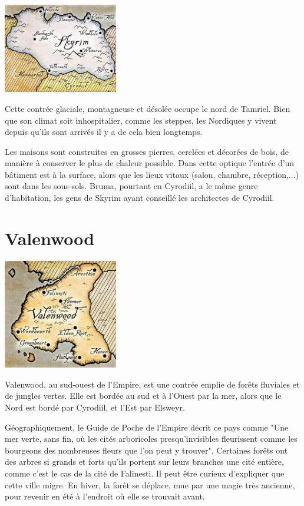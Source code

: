 \begin{center}
\includegraphics[width=5cm]{images/map_skyrim.jpg}
\end{center}

Cette contrée glaciale, montagneuse et désolée occupe le nord de Tamriel. Bien que son climat soit inhospitalier, comme les steppes, les Nordiques y vivent depuis qu'ils sont arrivés il y a de cela bien longtemps.

Les maisons sont construites en grosses pierres, cerclées et décorées de bois, de manière à conserver le plus de chaleur possible. Dans cette optique l'entrée d'un bâtiment est à la surface, alors que les lieux vitaux (salon, chambre, réception,...) sont dans les sous-sols. Bruma, pourtant en Cyrodiil, a le même genre d'habitation, les gens de Skyrim ayant conseillé les architectes de Cyrodiil.

\section{Valenwood}

\begin{center}
\includegraphics[width=5cm]{images/map_valenwood.jpg}
\end{center}

Valenwood, au sud-ouest de l'Empire, est une contrée emplie de forêts fluviales et de jungles vertes. Elle est bordée au sud et à l'Ouest par la mer, alors que le Nord est bordé par Cyrodiil, et l'Est par Elsweyr. 

Géographiquement, le Guide de Poche de l'Empire décrit ce pays comme "Une mer verte, sans fin, où les cités arboricoles presqu'invisibles fleurissent comme les bourgeons des nombreuses fleurs que l'on peut y trouver". Certaines forêts ont des arbres si grands et forts qu'ils portent sur leurs branches une cité entière, comme c'est le cas de la cité de Falinesti. Il peut être curieux d'expliquer que cette ville migre. En hiver, la forêt se déplace, mue par une magie très ancienne, pour revenir en été à l'endroit où elle se trouvait avant.

